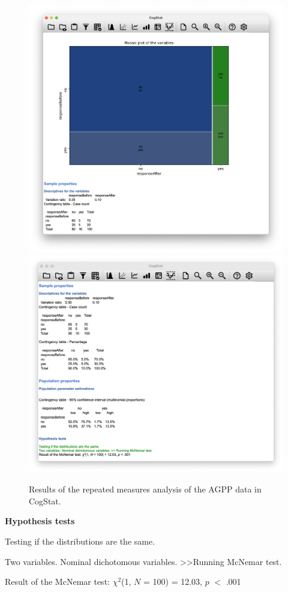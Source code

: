 \documentclass[
  11pt,
  a4paper,
  twoside,symmetric,openright]{book}
\theoremstyle{break}
\theoremstyle{break}
\begin{document}
\begin{figure}

{\centering \includegraphics[width=0.6\linewidth]{resources/image/cogstatagppresults1} \includegraphics[width=0.6\linewidth]{resources/image/cogstatagppresults2} 

}

\caption{Results of the repeated measures analysis of the AGPP data in CogStat.}\label{fig:cogstatagppresults}
\end{figure}

\begin{tcolorbox}[colback=white,
  colframe=lightgray,
  coltext=black,
  boxsep=4pt,
  boxrule=0.3pt,
  arc=0pt]
  {   \sffamily
      \color{CSblue}\textbf{Hypothesis tests}
      
      \color{CSgreen}Testing if the distributions are the same.
      
      Two variables. Nominal dichotomous variables. \textgreater\textgreater  Running McNemar test.
      
      \color{black}
      Result of the McNemar test: $\chi^2$(1, $N$ = 100) = 12.03, $p$ $<$ .001
      \normalfont
  }
\end{tcolorbox}
\end{document}
